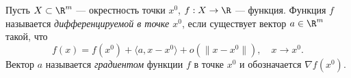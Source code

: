


\begin{definition}
  Пусть $X \subset \R^m$ --- окрестность точки $x^0$, $f : X \to \R$ --- функция. Функция $f$ называется \emph{дифференцируемой в точке $x^0$}, если существует вектор $a \in \R^m$ такой, что
  \[
    f(x) = f(x^0) + \langle a, x - x^0\rangle + o(\|x - x^0\|), \quad x \to x^0.
  \]
  Вектор $a$ называется \emph{градиентом} функции $f$ в точке $x^0$ и обозначается $\nabla f(x^0)$.
\end{definition}


